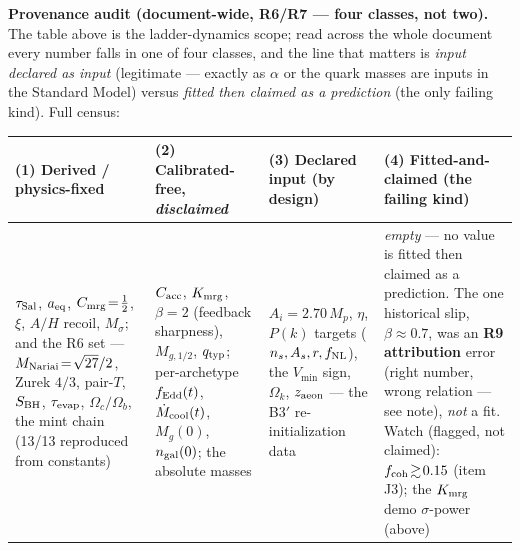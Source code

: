 \documentclass[11pt]{article}
\newcommand{\Msig}{M_\sigma}
\begin{document}
\medskip\noindent\textbf{Provenance audit (document-wide, R6/R7 --- four classes, not two).} The table above is the ladder-dynamics scope; read across the whole document every number falls in one of four classes, and the line that matters is \emph{input declared as input} (legitimate --- exactly as $\alpha$ or the quark masses are inputs in the Standard Model) versus \emph{fitted then claimed as a prediction} (the only failing kind). Full census:
\begin{center}\footnotesize
\begin{tabular}{@{}p{}p{}p{}p{}@{}}
\toprule
\textbf{(1) Derived / physics-fixed} & \textbf{(2) Calibrated-free, \emph{disclaimed}} & \textbf{(3) Declared input (by design)} & \textbf{(4) Fitted-and-claimed (the failing kind)} \\
\midrule
$\tau_{\rm Sal}$, $a_{\rm eq}$, $C_{\rm mrg}\!=\!\tfrac12$, $\xi$, $A/H$ recoil, $\Msig$; and the R6 set --- $M_{\rm Nariai}\!=\!\sqrt{27}/2$, Zurek $4/3$, pair-$T$, $S_{\rm BH}$, $\tau_{\rm evap}$, $\Omega_c/\Omega_b$, the mint chain (13/13 reproduced from constants) &
$C_{\rm acc}$, $K_{\rm mrg}$, $\beta\!=\!2$ (feedback sharpness), $M_{g,1/2}$, $q_{\rm typ}$; per-archetype $f_{\rm Edd}(t)$, $\dot M_{\rm cool}(t)$, $M_g(0)$, $n_{\rm gal}(0)$; the absolute masses &
$A_i\!=\!2.70\,M_p$, $\eta$, $P(k)$ targets ($n_s,A_s,r,f_{\rm NL}$), the $V_{\min}$ sign, $\Omega_k$, $z_{\rm aeon}$ --- the B3$'$ re-initialization data &
\emph{empty} --- no value is fitted then claimed as a prediction. The one historical slip, $\beta\!\approx\!0.7$, was an \textbf{R9 attribution} error (right number, wrong relation --- see note), \emph{not} a fit. Watch (flagged, not claimed): $f_{\rm coh}\!\gtrsim\!0.15$ (item J3); the $K_{\rm mrg}$ demo $\sigma$-power (above) \\
\bottomrule
\end{tabular}
\end{center}
\end{document}
